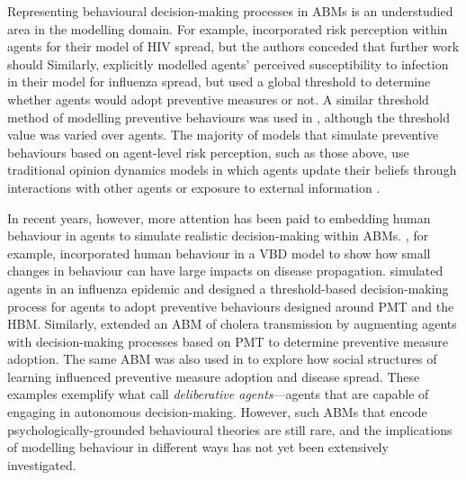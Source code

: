 Representing behavioural decision-making processes in ABMs is an understudied area in the modelling domain. For example, \citet{tully_coevolution_2013} incorporated risk perception within agents for their model of HIV spread, but the authors conceded that further work should  Similarly, \citet{du_how_2021} explicitly modelled agents' perceived susceptibility to infection in their model for influenza spread, but used a global threshold to determine whether agents would adopt preventive measures or not. A similar threshold method of modelling preventive behaviours was used in \citet{mao_modeling_2014}, although the threshold value was varied over agents. The majority of models that simulate preventive behaviours based on agent-level risk perception, such as those above, use traditional opinion dynamics models in which agents update their beliefs through interactions with other agents or exposure to external information \cite{du_how_2021, mao_modeling_2014, brainard_agent-based_2020, yu_how_2024}.

In recent years, however, more attention has been paid to embedding human behaviour in agents to simulate realistic decision-making within ABMs. \citet{scheidegger_agent-based_2017}, for example, incorporated human behaviour in a VBD model to show how small changes in behaviour can have large impacts on disease propagation. \citet{barbrook-johnson_uses_2017} simulated agents in an influenza epidemic and designed a threshold-based decision-making process for agents to adopt preventive behaviours designed around PMT and the HBM. Similarly, \citet{abdulkareem_intelligent_2018} extended an ABM of cholera transmission by augmenting agents with decision-making processes based on PMT to determine preventive measure adoption. The same ABM was also used in \citet{abdulkareem_risk_2020} to explore how social structures of learning influenced preventive measure adoption and disease spread. These examples exemplify what \citet{de_mooij_framework_2023} call \textit{deliberative agents}---agents that are capable of engaging in autonomous decision-making. However, such ABMs that encode psychologically-grounded behavioural theories are still rare, and the implications of modelling behaviour in different ways has not yet been extensively investigated.


